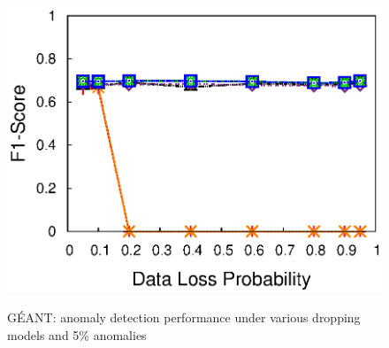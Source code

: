 {\begin{figure}[h!]
{    \includegraphics[width=\figurewidthQ]{fig/dect.ColRandLoss.srmf_based_pred.tm_totem..672.23.23.672.r8.period1.org.2d.col.ind.loss0.5.burst1.na0.05.anom0.4.noise0.thresh0.eps}
  }
  \vspace{-0.15in}
  \caption{G\'{E}ANT: anomaly detection performance under various
    dropping models and 5\% anomalies}
  \vspace{-0.15in}
  \label{fig:geant-drop-mode-detection}
\end{figure}

}
